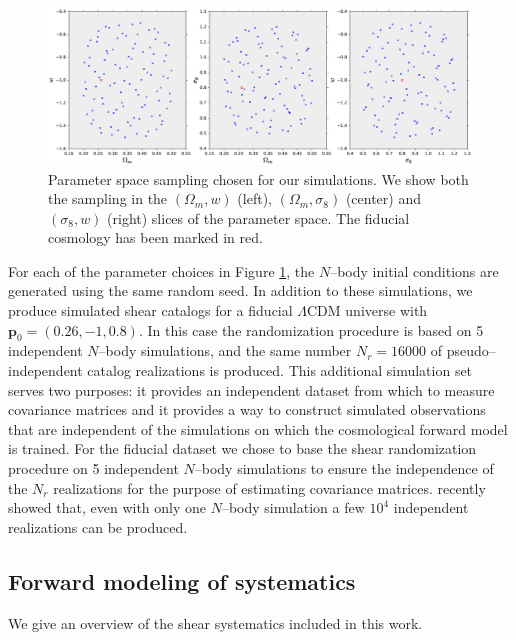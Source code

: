 \documentclass[reprint,aps,prd,superscriptaddress,showkeys,showpacs]{revtex4-1}
\newcommand{\bb}[1]{\mathbf{#1}}
\begin{document}
\begin{figure}
\includegraphics[scale=0.35]{Figures/design.eps}
\caption{Parameter space sampling chosen for our simulations. We show both the sampling in the $(\Omega_m,w)$ (left), $(\Omega_m,\sigma_8)$ (center) and $(\sigma_8,w)$ (right) slices of the parameter space. The fiducial cosmology has been marked in red.}
\label{fig:simdesign}
\end{figure}
%
For each of the parameter choices in Figure \ref{fig:simdesign}, the $N$--body initial conditions are generated using the same random seed. In addition to these simulations, we produce simulated shear catalogs for a fiducial $\Lambda$CDM universe with $\bb{p}_0=(0.26,-1,0.8)$. In this case the randomization procedure is based on 5 independent $N$--body simulations, and the same number $N_r=16000$ of pseudo--independent catalog realizations is produced. This additional simulation set serves two purposes: it provides an independent dataset from which to measure covariance matrices and it provides a way to construct simulated observations that are independent of the simulations on which the cosmological forward model is trained. For the fiducial dataset we chose to base the shear randomization procedure on 5 independent $N$--body simulations to ensure the independence of the $N_r$ realizations for the purpose of estimating covariance matrices. \citep{PetriVariance} recently showed that, even with only one $N$--body simulation a few $10^4$ independent realizations can be produced.   


\subsection{Forward modeling of systematics}
We give an overview of the shear systematics included in this work. 
\end{document}
